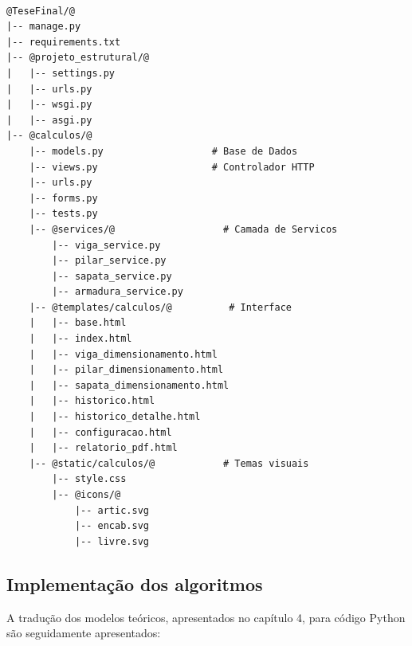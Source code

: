 \newpage
\begin{lstlisting}[basicstyle=\ttfamily\normalsize, moredelim={[is][\color{blue}\bfseries]{@}{@}}, morecomment={[l]\#}, commentstyle=\color{codegreen}\itshape, caption={Estrutura de ficheiros do projeto Django}, label={lst:estrutura_1}]

@TeseFinal/@
|-- manage.py
|-- requirements.txt
|-- @projeto_estrutural/@
|   |-- settings.py
|   |-- urls.py
|   |-- wsgi.py
|   |-- asgi.py
|-- @calculos/@
    |-- models.py                   # Base de Dados
    |-- views.py                    # Controlador HTTP
    |-- urls.py
    |-- forms.py
    |-- tests.py
    |-- @services/@                   # Camada de Servicos
        |-- viga_service.py
        |-- pilar_service.py
        |-- sapata_service.py
        |-- armadura_service.py
    |-- @templates/calculos/@          # Interface
    |   |-- base.html
    |   |-- index.html
    |   |-- viga_dimensionamento.html
    |   |-- pilar_dimensionamento.html
    |   |-- sapata_dimensionamento.html
    |   |-- historico.html
    |   |-- historico_detalhe.html
    |   |-- configuracao.html
    |   |-- relatorio_pdf.html
    |-- @static/calculos/@            # Temas visuais
        |-- style.css
        |-- @icons/@
            |-- artic.svg
            |-- encab.svg
            |-- livre.svg
\end{lstlisting}

\subsection{Implementação dos algoritmos}

A tradução dos modelos teóricos, apresentados no capítulo 4, para código Python são seguidamente apresentados:

